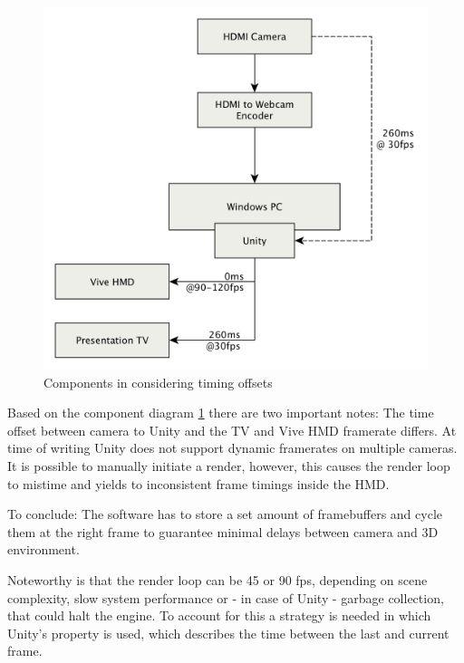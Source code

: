 \begin{figure}[htb]
	\includegraphics[width=\textwidth]{gfx/FPS-Timing-Components.png}
	\caption{Components in considering timing offsets}
	\label{fig:offsets:components}
\end{figure}

Based on the component diagram \ref{fig:offsets:components} there are two 
important notes: The time offset between camera to Unity and the TV and Vive 
HMD framerate differs. At time of writing Unity does not support dynamic 
framerates on multiple cameras. It is possible to manually initiate a render, 
however, this causes the render loop to mistime and yields to inconsistent 
frame timings inside the HMD.


To conclude: The software has to store a set amount of \gls{framebuffer}s and 
cycle them at the right frame to guarantee minimal delays between camera and 3D 
environment.
\newline

Noteworthy is that the render loop can be 45 or 90 fps, depending on scene 
complexity, slow system performance or - in case of Unity - garbage collection, 
that could halt the engine. To account for this a strategy is needed in which 
Unity's  property is used, which describes the time 
between the last and current frame.

